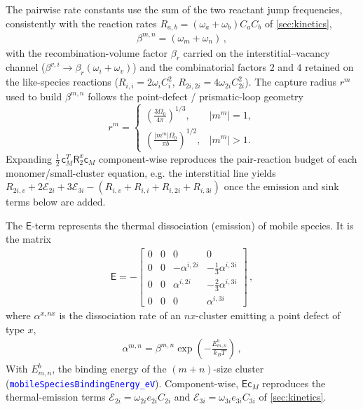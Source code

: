 \documentclass{article}
\newcommand{\textttclr}[1]{\textcolor{blue}{\texttt{#1}}}
\newcommand{\spvec}[1]{\bm{\mathsf{#1}}}   %
\newcommand{\spmat}[1]{\bm{\mathsf{#1}}}   %
\begin{document}
The pairwise rate constants use the sum of the two reactant jump frequencies, consistently with the reaction rates $R_{a,b}=(\omega_a+\omega_b)C_aC_b$ of \cref{sec:kinetics},
\begin{align}\label{eq:beta}
\beta^{m,n}=(\omega_m+\omega_n)\, ,
\end{align}
with the recombination-volume factor $\beta_r$ carried on the interstitial--vacancy channel ($\beta^{v,i}\to\beta_r(\omega_i+\omega_v)$) and the combinatorial factors $2$ and $4$ retained on the like-species reactions ($R_{i,i}=2\omega_iC_i^2$, $R_{2i,2i}=4\omega_{2i}C_{2i}^2$). The capture radius $r^m$ used to build $\beta^{m,n}$ follows the point-defect / prismatic-loop geometry
\begin{equation}
    r^m =
    \begin{cases}
        \displaystyle
        \left(\frac{3\Omega_0}{4\pi}\right)^{1/3},
        & \left|m^m\right|=1,
        \\[10pt]
        \displaystyle
        \left(\frac{\left|m^m\right|\Omega_0}{\pi b}\right)^{1/2},
        & \left|m^m\right|>1.
    \end{cases}
    \label{eq:mobile_capture_radius}
\end{equation}
Expanding $\tfrac12\,\spvec{c}_M^T\spmat{R}_2^{x}\spvec{c}_M$ component-wise reproduces the pair-reaction budget of each monomer/small-cluster equation, e.g. the interstitial line yields $R_{2i,v}+2\mathcal{E}_{2i}+3\mathcal{E}_{3i}-(R_{i,v}+R_{i,i}+R_{i,2i}+R_{i,3i})$ once the emission and sink terms below are added.

The $\spmat{E}$-term represents the thermal dissociation (emission) of mobile species. It is the matrix
\begin{align}\label{Eq:R1}
   {\spmat{E}} =  -
\begin{bmatrix}
 0 & 0 & 0 & 0 \\ 
0 & 0 & -\alpha^{i,2i} & -\tfrac{1}{3}\alpha^{i,3i}\\ 
0 & 0 & \alpha^{i,2i} & -\tfrac{2}{3}\alpha^{i,3i} \\ 
0 & 0 & 0 &    \alpha^{i,3i}
\end{bmatrix}\, ,
\end{align}
where $\alpha^{x,nx}$ is the dissociation rate of an $nx$-cluster emitting a point defect of type $x$,
\begin{align}
    \alpha^{m,n} = \beta^{m,n} \exp{ \left( -\frac{E^b_{m,n}}{k_B T} \right)}\, ,\label{eq:alpha}
\end{align}
With $E^b_{m,n}$, the binding energy of the $(m+n)$-size cluster (\textttclr{mobileSpeciesBindingEnergy\_eV}). Component-wise, $\spmat{E}\spvec{c}_M$ reproduces the thermal-emission terms $\mathcal{E}_{2i}=\omega_{2i}e_{2i}C_{2i}$ and $\mathcal{E}_{3i}=\omega_{3i}e_{3i}C_{3i}$ of \cref{sec:kinetics}.
\end{document}
